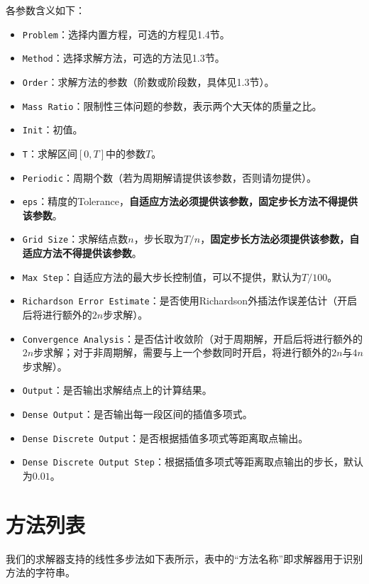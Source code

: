 \documentclass[lang=cn,10pt,bibend=bibtex]{elegantbook}
\begin{document}
各参数含义如下：
\begin{itemize}
  \item \verb|Problem|：选择内置方程，可选的方程见1.4节。
  \item \verb|Method|：选择求解方法，可选的方法见1.3节。
  \item \verb|Order|：求解方法的参数（阶数或阶段数，具体见1.3节）。
  \item \verb|Mass Ratio|：限制性三体问题的参数，表示两个大天体的质量之比。
  \item \verb|Init|：初值。
  \item \verb|T|：求解区间$[0,T]$中的参数$T$。
  \item \verb|Periodic|：周期个数（若为周期解请提供该参数，否则请勿提供）。
  \item \verb|eps|：精度的Tolerance，\textbf{自适应方法必须提供该参数，固定步长方法不得提供该参数}。
  \item \verb|Grid Size|：求解结点数$n$，步长取为$T/n$，\textbf{固定步长方法必须提供该参数，自适应方法不得提供该参数}。
  \item \verb|Max Step|：自适应方法的最大步长控制值，可以不提供，默认为$T/100$。
  \item \verb|Richardson Error Estimate|：是否使用Richardson外插法作误差估计（开启后将进行额外的$2n$步求解）。
  \item \verb|Convergence Analysis|：是否估计收敛阶（对于周期解，开启后将进行额外的$2n$步求解；对于非周期解，需要与上一个参数同时开启，将进行额外的$2n$与$4n$步求解）。
  \item \verb|Output|：是否输出求解结点上的计算结果。
  \item \verb|Dense Output|：是否输出每一段区间的插值多项式。
  \item \verb|Dense Discrete Output|：是否根据插值多项式等距离取点输出。
  \item \verb|Dense Discrete Output Step|：根据插值多项式等距离取点输出的步长，默认为$0.01$。
\end{itemize}

\section{方法列表}

我们的求解器支持的线性多步法如下表所示，表中的“方法名称”即求解器用于识别方法的字符串。
\end{document}

